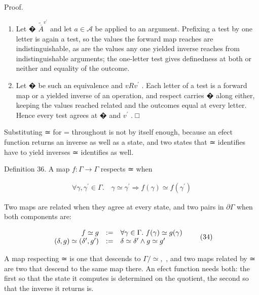 \documentclass[
  10
]{article}
\begin{document}
Proof.

\begin{enumerate}
\def\labelenumi{\arabic{enumi}.}
\item
  Let � \(\widetilde { \overline { { { A } } } } ^ { v ^ { \prime } }\)
  and let \(a \in { \mathcal { A } }\) be applied to an argument.
  Prefixing a test by one letter is again a test, so the values the
  forward map reaches are indistinguishable, as are the values any one
  yielded inverse reaches from indistinguishable arguments; the
  one-letter test gives definedness at both or neither and equality of
  the outcome.
\item
  Let � be such an equivalence and \(v R v ^ { \prime }\) . Each letter
  of a test is a forward map or a yielded inverse of an operation, and
  respect carries � along either, keeping the values reached related and
  the outcomes equal at every letter. Hence every test agrees at � and
  \(v ^ { \prime }\) . □
\end{enumerate}

Substituting ≃ for = throughout is not by itself enough, because an
efect function returns an inverse as well as a state, and two states
that ≃ identifies have to yield inverses ≃ identifies as well.

Definition 36. A map \(f : \Gamma \to \Gamma\) respects ≃ when

\[
\begin{array} { r } { \forall \gamma , \gamma ^ { \prime } \in \Gamma . \quad \gamma \simeq \gamma ^ { \prime } \Rightarrow f ( \gamma ) \simeq f ( \gamma ^ { \prime } ) } \end{array}\tag{33}
\]

Two maps are related when they agree at every state, and two pairs in
\(\partial \Gamma\) when both components are:

\[
\begin{array} { r c l } { f \simeq g } & { : = } & { \forall \gamma \in \Gamma . \ f ( \gamma ) \simeq g ( \gamma ) } \\ { ( \delta , g ) \simeq ( \delta ^ { \prime } , g ^ { \prime } ) } & { : = } & { \delta \simeq \delta ^ { \prime } \wedge g \simeq g ^ { \prime } } \end{array}\tag{34}
\]

A map respecting ≃ is one that descends to \(\Gamma / \simeq ,\) , and
two maps related by ≃ are two that descend to the same map there. An
efect function needs both: the first so that the state it computes is
determined on the quotient, the second so that the inverse it returns
is.
\end{document}
